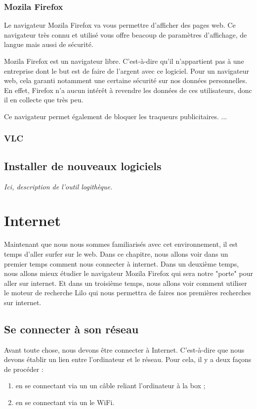 \documentclass[12pt]{book}
\begin{document}
	\subsection{Mozila Firefox}\label{sec:descfirefox}
		Le navigateur Mozila Firefox va vous permettre d'afficher des pages web.\newline
		Ce navigateur très connu et utilisé vous offre beacoup de paramètres d'affichage, de langue mais aussi de sécurité.\par
		Mozila Firefox est un navigateur libre.
		C'est-à-dire qu'il n'appartient pas à une entreprise dont le but est de faire de l'argent avec ce logiciel.
		Pour un navigateur web, cela garanti notamment une certaine sécurité sur nos données personnelles.
		En effet, Firefox n'a aucun intérêt à revendre les données de ces utilisateurs, donc il en collecte que très peu.\par
		Ce navigateur permet également de bloquer les traqueurs publicitaires.
		...
	\subsection{VLC}

\section{Installer de nouveaux logiciels}
	\textit{Ici, description de l'outil logithèque.}

\chapter{Internet}
Maintenant que nous nous sommes familiarisés avec cet environnement, il est temps d'aller surfer sur le web.\newline
Dans ce chapitre, nous allons voir dans un premier temps comment nous connecter à internet.
Dans un deuxième temps, nous allons mieux étudier le navigateur Mozila Firefox qui sera notre "porte" pour aller sur internet.
Et dans un troisième temps, nous allons voir comment utiliser le moteur de recherche Lilo qui nous permettra de faires nos premières recherches sur internet.
\section{Se connecter à son réseau}
	Avant toute chose, nous devons être connecter à Internet. C'est-à-dire que nous devons établir un lien entre l'ordinateur et le réseau.
	Pour cela, il y a deux façons de procéder :
	\begin{enumerate}
		\item en se connectant via un un câble reliant l'ordinateur à la box ;
		\item en se connectant via un le WiFi.
	\end{enumerate}
\end{document}
